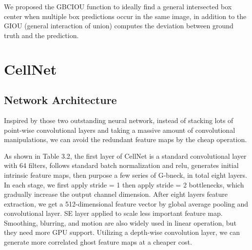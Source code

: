 We proposed the GBCIOU function to ideally find a general intersected box center when multiple box predictions occur in the same image, in addition to the GIOU (general interaction of union) computes the deviation between ground truth and the prediction.

\section{CellNet}
\label{sec:ipsum}


\subsection{Network Architecture} %
\label{sub:Network Architecture_2}
Inspired by those two outstanding neural network\cite{19}\cite{20}, instead of stacking lots of point-wise convolutional layers and taking a massive amount of convolutional manipulations, we can avoid the redundant feature maps by the cheap operation. 


As shown in Table 3.2, the first layer of CellNet is a standard convolutional layer with 64 filters, follows standard batch normalization and relu, generates initial intrinsic feature maps, then purpose a few series of G-bneck, in total eight layers. In each stage, we first apply stride = 1 then apply stride = 2 bottlenecks, which gradually increase the output channel dimension. After eight layers feature extraction, we get a 512-dimensional feature vector by global average pooling and convolutional layer. SE layer\cite{24} applied to scale less important feature map. Smoothing, blurring, and motion are also widely used in linear operation\cite{19}, but they need more GPU support. Utilizing a depth-wise convolution layer, we can generate more correlated ghost feature maps at a cheaper cost.

